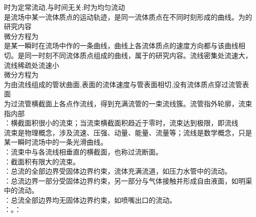 \divider

 时为定常流动,与时间无关;时为均匀流动\\

是流场中某一流体质点的运动轨迹，是同一流体质点在不同时刻形成的曲线。为的研究内容\\
微分方程为 \\
是某一瞬时在流场中作的一条曲线，曲线上各流体质点的速度方向都与该曲线相切。是同一时刻不同流体质点组成的曲线，属于的研究内容。流线密集处流速大，流线稀疏处流速小\\
微分方程为\\
为由流线组成的管状曲面,表面的流体速度与管表面相切,没有流体质点穿过流管表面\\
为过流管横截面上各点作流线，得到充满流管的一束流线簇。流管指外轮廓，流束指内部\\
：横截面积很小的流束；当流束横截面积趋近于零时，流束达到极限，即流线\\
流束是物理概念，涉及流速、压强、动量、能量、流量等；流线是数学概念，只是某一瞬时流场中的一条光滑曲线。\\
：流束中与各流线相垂直的横截面，也称过流断面。\\
：截面积有限大的流束。\\
：总流的全部边界受固体边界约束，流体充满流道，如压力水管中的流动。\\
：总流边界一部分受固体边界约束，另一部分与气体接触并形成自由液面，如明渠中的流动。\\
：总流全部边界均无固体边界约束，如喷嘴出口的流动。\\
：。：

\divider


